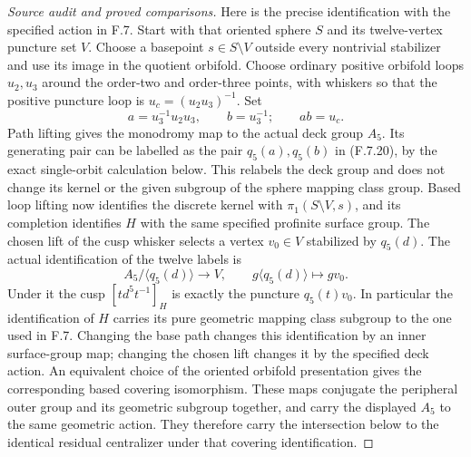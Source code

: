 \begin{proof}[Source audit and proved comparisons]
Here is the precise identification with the specified
action in F.7.  Start with that oriented sphere $S$
and its twelve-vertex puncture set $V$.  Choose a
basepoint $s\in S\setminus V$ outside every nontrivial
stabilizer and use its image in the quotient orbifold.
Choose ordinary positive orbifold loops $u_2,u_3$
around the order-two and order-three points, with
whiskers so that the positive puncture loop is
$u_c=(u_2u_3)^{-1}$.  Set
\[
             a=u_3^{-1}u_2u_3,\qquad b=u_3^{-1};
                   \qquad ab=u_c.
\]
Path lifting gives the monodromy map to the actual
deck group $A_5$.  Its generating pair can be labelled
as the pair $q_5(a),q_5(b)$ in (F.7.20), by the exact
single-orbit calculation below.  This relabels the
deck group and does not change its kernel or the
given subgroup of the sphere mapping class group.
Based loop lifting now identifies the discrete
kernel with $\pi_1(S\setminus V,s)$, and its completion
identifies $H$ with the same specified profinite
surface group.  The chosen lift of the cusp whisker
selects a vertex $v_0\in V$ stabilized by $q_5(d)$.
The actual identification of the twelve labels is
\[
        A_5/\langle q_5(d)\rangle\longrightarrow V,
                   \qquad g\langle q_5(d)\rangle
                                    \longmapsto g v_0.
\]
Under it the cusp $[t d^5t^{-1}]_H$ is exactly the
puncture $q_5(t)v_0$.  In particular the identification
of $H$ carries its pure geometric mapping class
subgroup to the one used in F.7.
Changing the base path changes this identification
by an inner surface-group map; changing the chosen
lift changes it by the specified deck action.
An equivalent choice of the oriented orbifold
presentation gives the corresponding based covering
isomorphism.  These maps conjugate the peripheral
outer group and its geometric subgroup together,
and carry the displayed $A_5$ to the same geometric
action.  They therefore carry the intersection
below to the identical residual centralizer under
that covering identification.


\end{proof}
